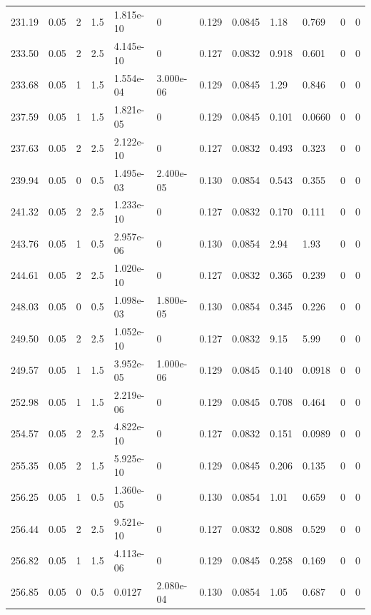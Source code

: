 \documentclass[preview]{standalone}
\begin{document}
{{{{\begin{tabular}{L{1.2cm}C{1.2cm} C{0.3cm}C{0.5cm} C{1.4cm}C{1.4cm} C{1.4cm}C{1.4cm} C{1.6cm}C{1.6cm} C{1.6cm}C{1.6cm}}
  231.19  &  0.05  & 2     & 1.5 &  1.815e-10  & 0  &  0.129&   0.0845& 1.18 & 0.769   &  0 & 0  \\ 
  233.50  &  0.05  & 2     & 2.5 &  4.145e-10  & 0  &  0.127&   0.0832& 0.918 & 0.601   &  0 & 0  \\ 
  233.68  &  0.05  & 1     & 1.5 &  1.554e-04  & 3.000e-06  &  0.129&   0.0845& 1.29 & 0.846   &  0 & 0  \\ 
  237.59  &  0.05  & 1     & 1.5 &  1.821e-05  & 0  &  0.129&   0.0845& 0.101 & 0.0660   &  0 & 0  \\ 
  237.63  &  0.05  & 2     & 2.5 &  2.122e-10  & 0  &  0.127&   0.0832& 0.493 & 0.323   &  0 & 0  \\ 
  239.94  &  0.05  & 0     & 0.5 &  1.495e-03  & 2.400e-05  &  0.130&   0.0854& 0.543 & 0.355   &  0 & 0  \\ 
  241.32  &  0.05  & 2     & 2.5 &  1.233e-10  & 0  &  0.127&   0.0832& 0.170 & 0.111   &  0 & 0  \\ 
  243.76  &  0.05  & 1     & 0.5 &  2.957e-06  & 0  &  0.130&   0.0854& 2.94 & 1.93   &  0 & 0  \\ 
  244.61  &  0.05  & 2     & 2.5 &  1.020e-10  & 0  &  0.127&   0.0832& 0.365 & 0.239   &  0 & 0  \\ 
  248.03  &  0.05  & 0     & 0.5 &  1.098e-03  & 1.800e-05  &  0.130&   0.0854& 0.345 & 0.226   &  0 & 0  \\ 
  249.50  &  0.05  & 2     & 2.5 &  1.052e-10  & 0  &  0.127&   0.0832& 9.15 & 5.99   &  0 & 0  \\ 
  249.57  &  0.05  & 1     & 1.5 &  3.952e-05  & 1.000e-06  &  0.129&   0.0845& 0.140 & 0.0918   &  0 & 0  \\ 
  252.98  &  0.05  & 1     & 1.5 &  2.219e-06  & 0  &  0.129&   0.0845& 0.708 & 0.464   &  0 & 0  \\ 
  254.57  &  0.05  & 2     & 2.5 &  4.822e-10  & 0  &  0.127&   0.0832& 0.151 & 0.0989   &  0 & 0  \\ 
  255.35  &  0.05  & 2     & 1.5 &  5.925e-10  & 0  &  0.129&   0.0845& 0.206 & 0.135   &  0 & 0  \\ 
  256.25  &  0.05  & 1     & 0.5 &  1.360e-05  & 0  &  0.130&   0.0854& 1.01 & 0.659   &  0 & 0  \\ 
  256.44  &  0.05  & 2     & 2.5 &  9.521e-10  & 0  &  0.127&   0.0832& 0.808 & 0.529   &  0 & 0  \\ 
  256.82  &  0.05  & 1     & 1.5 &  4.113e-06  & 0  &  0.129&   0.0845& 0.258 & 0.169   &  0 & 0  \\ 
  256.85  &  0.05  & 0     & 0.5 &  0.0127  & 2.080e-04  &  0.130&   0.0854& 1.05 & 0.687   &  0 & 0  \\ 

\end{tabular}}}}}
\end{document}
